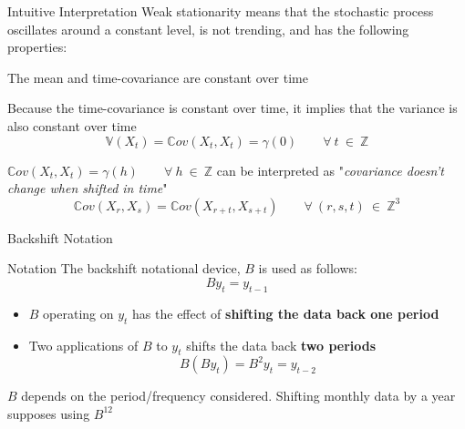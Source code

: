 \documentclass{beamer}
\newenvironment{wideenumerate}{\enumerate\addtolength{\itemsep}{10pt}}{\endenumerate}
\begin{document}
\appendix
\begin{frame}{Intuitive Interpretation}
   Weak stationarity means that the stochastic process oscillates around a constant level, is not trending, and has the following properties:\\
  
  \begin{wideenumerate}
  \item The mean and time-covariance are constant over time

\item Because the time-covariance is constant over time, it implies that the variance is also constant over time
  \begin{equation*}
\mathbb{V}(X_t) = \mathbb{C}ov(X_t, X_{t}) = \gamma(0) \qquad \forall \ t \ \in \ \mathbb{Z}
  \end{equation*}
\item $\mathbb{C}ov(X_t, X_{t}) = \gamma(h) \qquad \forall \ h \ \in \ \mathbb{Z}$ can be interpreted as "\emph{covariance doesn't change when shifted in time}"
  \begin{equation*}
\mathbb{C}ov(X_r, X_s) = \mathbb{C}ov(X_{r+t}, X_{s+t}) \qquad \forall \ (r, s, t) \ \in \ \mathbb{Z}^3
  \end{equation*}
  
  \end{wideenumerate}
\end{frame}
\begin{frame}{Backshift Notation}

  \begin{block}{Notation}
    The backshift notational device, $B$ is used as follows:\\

    \begin{equation*}
      B y_t = y_{t-1}
    \end{equation*}
  \end{block}

    
    \begin{itemize}
    \item   $B$ operating on $y_t$ has the effect of \textbf{shifting the data back one period}
    \item   Two applications of $B$ to $y_t$ shifts the data back \textbf{two periods}
      \begin{equation*}
        B(By_t) = B^2 y_t = y_{t-2}
      \end{equation*}
    \end{itemize}
    
$B$ depends on the period/frequency considered. Shifting monthly data by a year supposes using $B^{12}$

\end{frame}
\end{document}
